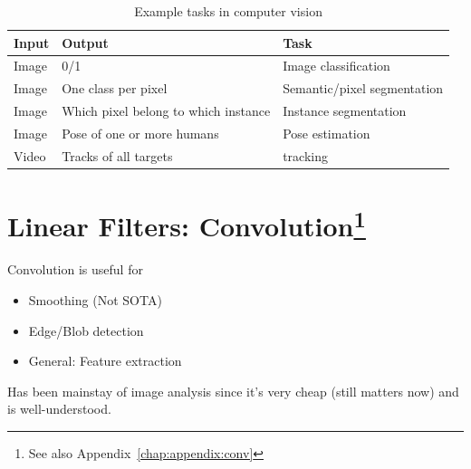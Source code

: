 \begin{table}[htpb]
  \centering
  \begin{tabular}{lll}
    \toprule
    Input & Output & Task \\
    \midrule
    Image & 0/1 & Image classification \\
    Image & One class per pixel & Semantic/pixel segmentation \\
    Image & Which pixel belong to which instance & Instance segmentation \\
    Image & Pose of one or more humans & Pose estimation \\
    Video & Tracks of all targets & tracking \\ \bottomrule
  \end{tabular}
  \caption{Example tasks in computer vision}%
  \label{tab:ex:tasks}
\end{table}

\section[Convolution]{Linear Filters: Convolution\footnote{See also
    Appendix~\ref{chap:appendix:conv}}}
Convolution is useful for
\begin{itemize}
\item Smoothing (Not SOTA)
\item Edge/Blob detection
\item General: Feature extraction
\end{itemize}
Has been mainstay of image analysis since it's very cheap (still
matters now) and is well-understood.

